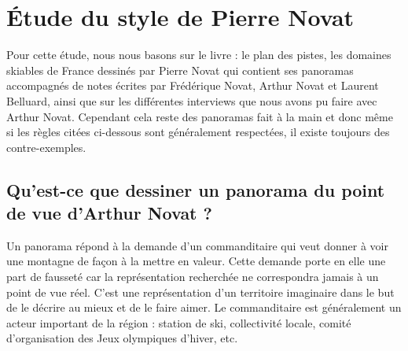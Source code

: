 \section{Étude du style de Pierre Novat}

Pour cette étude, nous nous basons sur le livre : le plan des pistes, les domaines skiables de France dessinés par Pierre Novat \cite{novat2013plans} qui contient ses panoramas accompagnés de notes écrites par Frédérique Novat, Arthur Novat et Laurent Belluard, ainsi que sur les différentes interviews que nous avons pu faire avec Arthur Novat. Cependant cela reste des panoramas fait à la main et donc même si les règles citées ci-dessous sont généralement respectées, il existe toujours des contre-exemples.



\subsection{Qu'est-ce que dessiner un panorama du point de vue d'Arthur Novat ?}
Un panorama répond à la demande d’un commanditaire qui veut donner à voir une montagne de façon à la mettre en valeur. Cette demande porte en elle une part de fausseté car la représentation recherchée ne correspondra jamais à un point de vue réel. C’est une représentation d’un territoire imaginaire dans le but de le décrire au mieux et de le faire aimer. 
Le commanditaire est généralement un acteur important de la région : station de ski, collectivité locale, comité d'organisation des Jeux olympiques d'hiver, etc.

